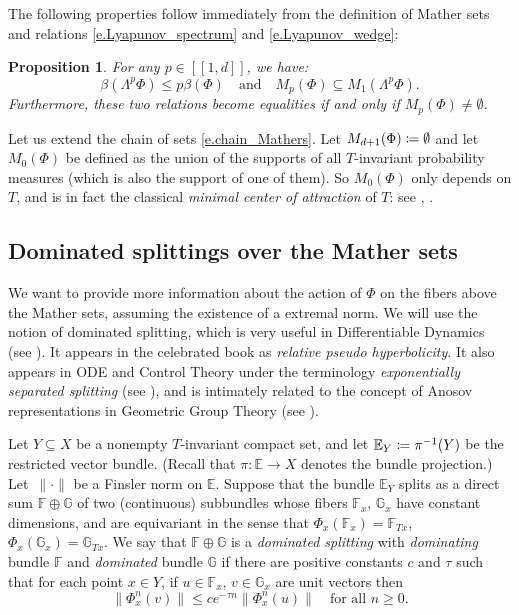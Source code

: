 \documentclass[10pt]{amsart}
\newcommand{\ldbrack}{[\![}
\newcommand{\rdbrack}{]\!]}
\def\vcentcolon{\mathrel{\mathop\ordinarycolon}}
\providecommand\ordinarycolon{:}
\providecommand*\coloneqq{\vcentcolon\mathrel{\mkern-1.2mu}=}
\theoremstyle{plain}
\newtheorem{proposition}[theorem]{Proposition}
\theoremstyle{definition}
\newcommand{\EE}{\mathbb{E}}
\newcommand{\FF}{\mathbb{F}}
\newcommand{\GG}{\mathbb{G}}
\newcommand{\WEDGE}{\mathsf{\Lambda}}
\begin{document}
The following properties follow immediately from the definition of Mather sets and relations \eqref{e.Lyapunov_spectrum} and \eqref{e.Lyapunov_wedge}:

\begin{proposition}\label{p.Mathers}
For any $p \in \ldbrack 1,d \rdbrack$, we have:
\[
\beta(\WEDGE^p \Phi) \le p \beta(\Phi)
\quad \text{and} \quad
M_p(\Phi)\subseteq M_1(\WEDGE^p \Phi).
\]
Furthermore, these two relations become equalities if and only if $M_p(\Phi) \neq \emptyset$.
\end{proposition}

Let us extend the chain of sets \eqref{e.chain_Mathers}.
Let $M_{d+1}(\Phi) \coloneqq \emptyset$
and let $M_0(\Phi)$ be defined as the union of the supports of all $T$-invariant probability measures (which is also the support of one of them). So $M_0(\Phi)$ only depends on $T$, and is in fact the classical \emph{minimal center of attraction} of $T$: see \cite{Sigmund}, \cite[p.\,164]{Akin}.

\subsection{Dominated splittings over the Mather sets}\label{ss.Mather_dom}

We want to provide more infor\-mation about the action of $\Phi$ on the fibers above the Mather sets, assuming the existence of a extremal norm.
We will use the notion of dominated splitting, which is very useful in Differentiable Dynamics (see \cite{BDV_book}).
It appears in the celebrated book \cite{HPS} as \emph{relative pseudo hyperbolicity}.
It also appears in ODE and Control Theory under the terminology \emph{exponentially separated splitting} (see \cite{CK_book}), and is intimately related to the concept of Anosov representations in Geometric Group Theory (see \cite{BPS}).

Let $Y \subseteq X$ be a nonempty $T$-invariant compact set, and let $\EE_Y \coloneqq \pi^{-1}(Y)$ be the restricted vector bundle. (Recall that $\pi \colon \EE \to X$ denotes the bundle projection.)
Let~$\| \mathord{\cdot} \|$ be a Finsler norm on $\EE$.
Suppose that the bundle $\EE_Y$ splits as a direct sum $\FF \oplus \GG$ of two (continuous) subbundles whose fibers $\FF_x$, $\GG_x$ have constant dimensions, and are equivariant in the sense that $\Phi_x(\FF_x) = \FF_{Tx}$, $\Phi_x(\GG_x) = \GG_{Tx}$.
We say that $\FF \oplus \GG$ is a \emph{dominated splitting} with \emph{dominating} bundle $\FF$ and \emph{dominated} bundle $\GG$ if there are positive constants $c$ and $\tau$ such that for each point $x \in Y$, if $u \in \FF_x$, $v \in \GG_x$ are unit vectors then
\begin{equation}\label{e.def_DS}
\| \Phi_x^n(v) \| \le c e^{-\tau n} \| \Phi_x^n(u) \| \quad \text{for all } n \ge 0.
\end{equation}
\end{document}
